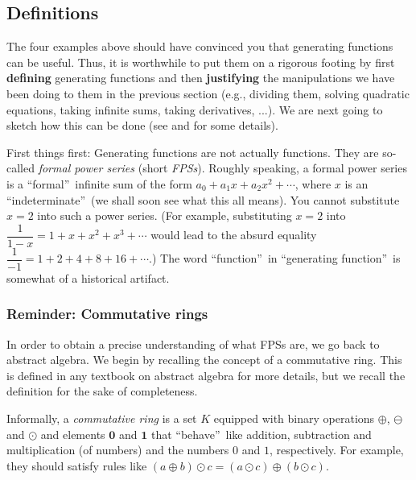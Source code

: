 \subsection{\label{sec.gf.defs}Definitions}

The four examples above should have convinced you that generating functions
can be useful. Thus, it is worthwhile to put them on a rigorous footing by
first \textbf{defining} generating functions and then \textbf{justifying} the
manipulations we have been doing to them in the previous section (e.g.,
dividing them, solving quadratic equations, taking infinite sums, taking
derivatives, ...). We are next going to sketch how this can be done (see
\cite[Chapter 7 (in the 1st edition)]{Loehr-BC} and \cite[Chapter 7]{19s} for
some details).

First things first: Generating functions are not actually functions. They are
so-called \emph{formal power series} (short \emph{FPSs}). Roughly speaking, a
formal power series is a \textquotedblleft formal\textquotedblright\ infinite
sum of the form $a_{0}+a_{1}x+a_{2}x^{2}+\cdots$, where $x$ is an
\textquotedblleft indeterminate\textquotedblright\ (we shall soon see what
this all means). You cannot substitute $x=2$ into such a power series. (For
example, substituting $x=2$ into $\dfrac{1}{1-x}=1+x+x^{2}+x^{3}+\cdots$ would
lead to the absurd equality $\dfrac{1}{-1}=1+2+4+8+16+\cdots$.) The word
\textquotedblleft function\textquotedblright\ in \textquotedblleft generating
function\textquotedblright\ is somewhat of a historical artifact.

\subsubsection{\label{subsec.gf.defs.commrings}Reminder: Commutative rings}

In order to obtain a precise understanding of what FPSs are, we go back to
abstract algebra. We begin by recalling the concept of a commutative ring.
This is defined in any textbook on abstract algebra for more details, but we
recall the definition for the sake of completeness.

Informally, a \emph{commutative ring} is a set $K$ equipped with binary
operations $\oplus$, $\ominus$ and $\odot$ and elements $\mathbf{0}$ and
$\mathbf{1}$ that \textquotedblleft behave\textquotedblright\ like addition,
subtraction and multiplication (of numbers) and the numbers $0$ and $1$,
respectively. For example, they should satisfy rules like $\left(  a\oplus
b\right)  \odot c=\left(  a\odot c\right)  \oplus\left(  b\odot c\right)  $.


